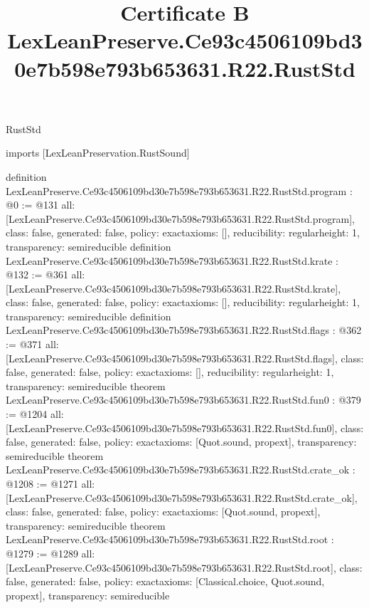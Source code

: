 \begin{lexlean}{RustStd}
\title{Certificate B LexLeanPreserve.Ce93c4506109bd30e7b598e793b653631.R22.RustStd}
\begin{coremodule}
imports [LexLeanPreservation.RustSound]

definition LexLeanPreserve.Ce93c4506109bd30e7b598e793b653631.R22.RustStd.program : @0 := @131 {
  all: [LexLeanPreserve.Ce93c4506109bd30e7b598e793b653631.R22.RustStd.program],
  class: false,
  generated: false,
  policy: exact{axioms: []},
  reducibility: regular{height: 1},
  transparency: semireducible
}
definition LexLeanPreserve.Ce93c4506109bd30e7b598e793b653631.R22.RustStd.krate : @132 := @361 {
  all: [LexLeanPreserve.Ce93c4506109bd30e7b598e793b653631.R22.RustStd.krate],
  class: false,
  generated: false,
  policy: exact{axioms: []},
  reducibility: regular{height: 1},
  transparency: semireducible
}
definition LexLeanPreserve.Ce93c4506109bd30e7b598e793b653631.R22.RustStd.flags : @362 := @371 {
  all: [LexLeanPreserve.Ce93c4506109bd30e7b598e793b653631.R22.RustStd.flags],
  class: false,
  generated: false,
  policy: exact{axioms: []},
  reducibility: regular{height: 1},
  transparency: semireducible
}
theorem LexLeanPreserve.Ce93c4506109bd30e7b598e793b653631.R22.RustStd.fun0 : @379 := @1204 {
  all: [LexLeanPreserve.Ce93c4506109bd30e7b598e793b653631.R22.RustStd.fun0],
  class: false,
  generated: false,
  policy: exact{axioms: [Quot.sound, propext]},
  transparency: semireducible
}
theorem LexLeanPreserve.Ce93c4506109bd30e7b598e793b653631.R22.RustStd.crate_ok : @1208 := @1271 {
  all: [LexLeanPreserve.Ce93c4506109bd30e7b598e793b653631.R22.RustStd.crate_ok],
  class: false,
  generated: false,
  policy: exact{axioms: [Quot.sound, propext]},
  transparency: semireducible
}
theorem LexLeanPreserve.Ce93c4506109bd30e7b598e793b653631.R22.RustStd.root : @1279 := @1289 {
  all: [LexLeanPreserve.Ce93c4506109bd30e7b598e793b653631.R22.RustStd.root],
  class: false,
  generated: false,
  policy: exact{axioms: [Classical.choice, Quot.sound, propext]},
  transparency: semireducible
}


\end{coremodule}
\end{lexlean}
